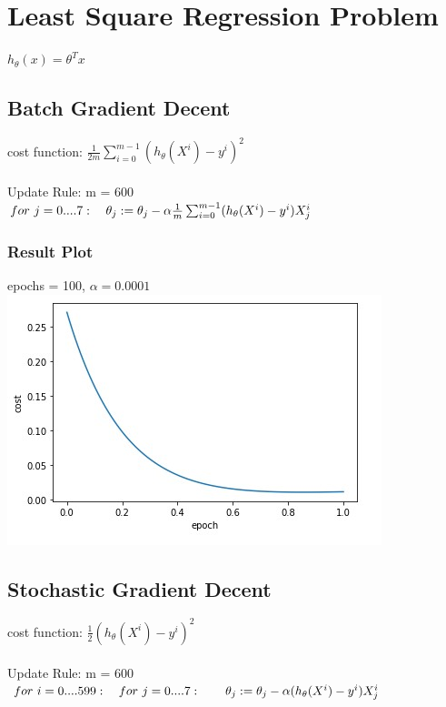 \documentclass[10pt]{article}
\begin{document}
\section{Least Square Regression Problem}
    $h_{\theta}(x) = \theta^Tx$ 
\subsection{Batch Gradient Decent}
cost function:
    $\frac{1}{2m} \sum_{i=0}^{m-1}(h_{\theta}(X^{i}) - y^{i})^{2}$
    \\\\
Update Rule: m = 600\\
    $for~j=0....7:\\
    ~~~ \theta_{j} := \theta_{j} - \alpha \frac{1}{m} \sum_{i=0}^{m-1} (h_{\theta}(X^{i}) - y^{i}) X^{i}_{j}$
    
\subsubsection{Result Plot}
epochs = 100, $\alpha = 0.0001$\\

\includegraphics[scale=.6]{mse_batch}

\subsection{Stochastic Gradient Decent}
cost function:
    $ \frac{1}{2}(h_{\theta}(X^{i}) - y^{i})^{2}$
    \\\\
Update Rule: m = 600\\
    $ for~i=0....599:\\
    ~~~for~j=0....7:\\
    ~~~~~~\theta_{j} := \theta_{j} - \alpha (h_{\theta}(X^{i}) - y^{i}) X^{i}_{j}$
    
\end{document}
